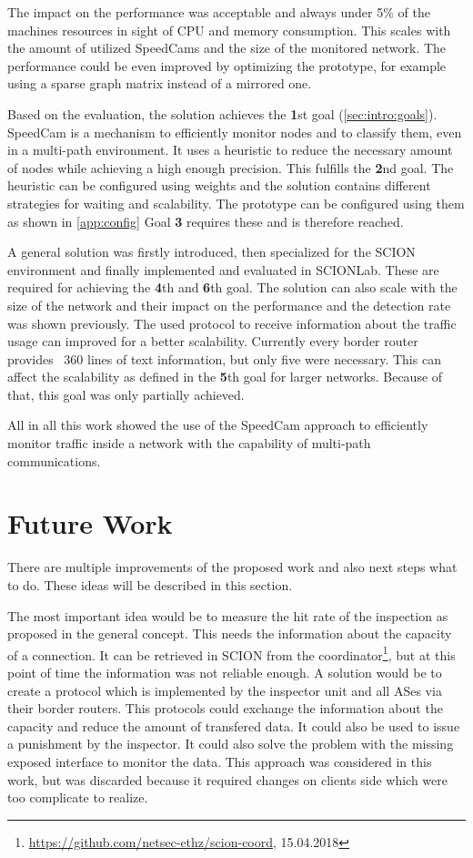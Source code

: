 \documentclass[thesis.tex]{subfiles}
\begin{document}
The impact on the performance was acceptable and always under 5\% of the machines resources in sight of CPU and memory consumption. This scales with the amount of utilized SpeedCams and the size of the monitored network. The performance could be even improved by optimizing the prototype, for example using a sparse graph matrix instead of a mirrored one. 

Based on the evaluation, the solution achieves the \textbf{1}st goal (\autoref{sec:intro:goals}). SpeedCam is a mechanism to efficiently monitor nodes and to classify them, even in a multi-path environment. It uses a heuristic to reduce the necessary amount of nodes while achieving a high enough precision. This fulfills the \textbf{2}nd goal. The heuristic can be configured using weights and the solution contains different strategies for waiting and scalability. The prototype can be configured using them as shown in \autoref{app:config} Goal \textbf{3} requires these and is therefore reached.

A general solution was firstly introduced, then specialized for the SCION environment and finally implemented and evaluated in SCIONLab. These are required for achieving the \textbf{4}th and \textbf{6}th goal. The solution can also scale with the size of the network and their impact on the performance and the detection rate was shown previously. The used protocol to receive information about the traffic usage can improved for a better scalability. Currently every border router provides ~360 lines of text information, but only five were necessary. This can affect the scalability as defined in the \textbf{5}th goal for larger networks. Because of that, this goal was only partially achieved.

All in all this work showed the use of the SpeedCam approach to efficiently monitor traffic inside a network with the capability of multi-path communications.

\section{Future Work} \label{sec:concl:future}
There are multiple improvements of the proposed work and also next steps what to do. These ideas will be described in this section.

The most important idea would be to measure the hit rate of the inspection as proposed in the general concept. This needs the information about the capacity of a connection. It can be retrieved in SCION from the coordinator\footnote{\url{https://github.com/netsec-ethz/scion-coord}, 15.04.2018}, but at this point of time the information was not reliable enough. A solution would be to create a protocol which is implemented by the inspector unit and all ASes via their border routers. This protocols could exchange the information about the capacity and reduce the amount of transfered data. It could also be used to issue a punishment by the inspector. It could also solve the problem with the missing exposed interface to monitor the data. This approach was considered in this work, but was discarded because it required changes on clients side which were too complicate to realize.
\end{document}
